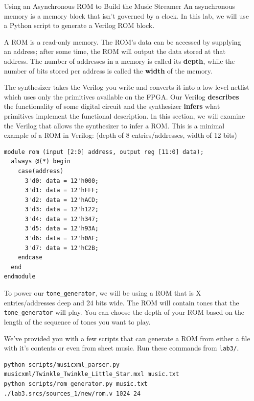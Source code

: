 \documentclass[11pt]{article}
\makeatletter
\renewcommand{\section}
{\@startsection {section}{1}{0pt}
 {-2ex}
 {1ex}
 {\bfseries\Large}}
\makeatother
\begin{document}
\section{Using an Asynchronous ROM to Build the Music Streamer}
An asynchronous memory is a memory block that isn't governed by a clock.
In this lab, we will use a Python script to generate a Verilog ROM block.

A ROM is a read-only memory.
The ROM's data can be accessed by supplying an address; after some time, the ROM will output the data stored at that address.
The number of addresses in a memory is called its \textbf{depth}, while the number of bits stored per address is called the \textbf{width} of the memory.

The synthesizer takes the Verilog you write and converts it into a low-level netlist which uses only the primitives available on the FPGA.
Our Verilog \textbf{describes} the functionality of some digital circuit and the synthesizer \textbf{infers} what primitives implement the functional description.
In this section, we will examine the Verilog that allows the synthesizer to infer a ROM.
This is a minimal example of a ROM in Verilog: (depth of 8 entries/addresses, width of 12 bits)

\begin{verbatim}
module rom (input [2:0] address, output reg [11:0] data);
  always @(*) begin
    case(address)
      3'd0: data = 12'h000;
      3'd1: data = 12'hFFF;
      3'd2: data = 12'hACD;
      3'd3: data = 12'h122;
      3'd4: data = 12'h347;
      3'd5: data = 12'h93A;
      3'd6: data = 12'h0AF;
      3'd7: data = 12'hC2B;
    endcase
  end
endmodule
\end{verbatim}

To power our \verb|tone_generator|, we will be using a ROM that is X entries/addresses deep and 24 bits wide.
The ROM will contain tones that the \verb|tone_generator| will play. You can choose the depth of your ROM based on the length of the sequence of tones you want to play.

We've provided you with a few scripts that can generate a ROM from either a file with it's contents or even from sheet music. Run these commands from \verb|lab3/|.

\begin{verbatim}
python scripts/musicxml_parser.py musicxml/Twinkle_Twinkle_Little_Star.mxl music.txt
python scripts/rom_generator.py music.txt ./lab3.srcs/sources_1/new/rom.v 1024 24
\end{verbatim}
\end{document}
